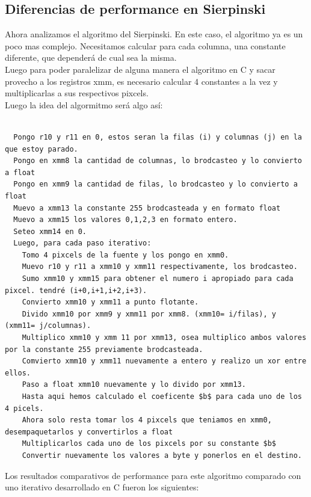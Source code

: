 \documentclass[a4paper]{article}
\begin{document}
\subsection{Diferencias de performance en Sierpinski}
Ahora analizamos el algoritmo del Sierpinski. En este caso, el algoritmo ya es un poco mas complejo. Necesitamos calcular para cada columna, una constante diferente, que dependerá de cual sea la misma.
\\
Luego para poder paralelizar de alguna manera el algoritmo en C y sacar provecho a los registros xmm, es necesario calcular 4 constantes a la vez y multiplicarlas a sus respectivos pixcels.
\\
Luego la idea del algormitmo será algo así:
\begin{codesnippet}
\begin{verbatim}

  Pongo r10 y r11 en 0, estos seran la filas (i) y columnas (j) en la que estoy parado.
  Pongo en xmm8 la cantidad de columnas, lo brodcasteo y lo convierto a float
  Pongo en xmm9 la cantidad de filas, lo brodcasteo y lo convierto a float
  Muevo a xmm13 la constante 255 brodcasteada y en formato float
  Muevo a xmm15 los valores 0,1,2,3 en formato entero.
  Seteo xmm14 en 0.
  Luego, para cada paso iterativo:
    Tomo 4 pixcels de la fuente y los pongo en xmm0.
    Muevo r10 y r11 a xmm10 y xmm11 respectivamente, los brodcasteo.
    Sumo xmm10 y xmm15 para obtener el numero i apropiado para cada pixcel. tendré (i+0,i+1,i+2,i+3).
    Convierto xmm10 y xmm11 a punto flotante.
    Divido xmm10 por xmm9 y xmm11 por xmm8. (xmm10= i/filas), y (xmm11= j/columnas).
    Multiplico xmm10 y xmm 11 por xmm13, osea multiplico ambos valores por la constante 255 previamente brodcasteada.
    Comvierto xmm10 y xmm11 nuevamente a entero y realizo un xor entre ellos.
    Paso a float xmm10 nuevamente y lo divido por xmm13.
    Hasta aqui hemos calculado el coeficente $b$ para cada uno de los 4 picels.
    Ahora solo resta tomar los 4 pixcels que teniamos en xmm0, desempaquetarlos y convertirlos a float
    Multiplicarlos cada uno de los pixcels por su constante $b$
    Convertir nuevamente los valores a byte y ponerlos en el destino.
\end{verbatim}
\end{codesnippet}

Los resultados comparativos de performance para este algoritmo comparado con uno iterativo desarrollado en C fueron los siguientes:
\end{document}
